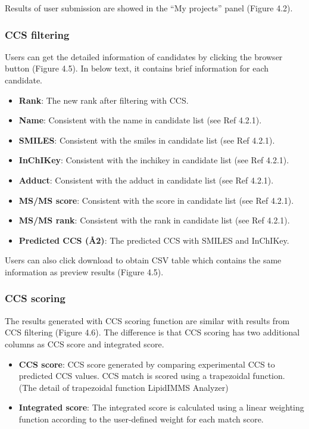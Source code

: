 \documentclass[12pt,]{book}
\providecommand{\tightlist}{%
  \setlength{\itemsep}{0pt}\setlength{\parskip}{0pt}}
\theoremstyle{definition}
\theoremstyle{definition}
\theoremstyle{definition}
\theoremstyle{remark}
\begin{document}
Results of user submission are showed in the ``My projects'' panel
(Figure 4.2).

\subsubsection{CCS filtering}\label{ccs-filtering}

Users can get the detailed information of candidates by clicking the
browser button (Figure 4.5). In below text, it contains brief
information for each candidate.

\begin{itemize}
\tightlist
\item
  \textbf{Rank}: The new rank after filtering with CCS.
\item
  \textbf{Name}: Consistent with the name in candidate list (see Ref
  4.2.1).
\item
  \textbf{SMILES}: Consistent with the smiles in candidate list (see Ref
  4.2.1).
\item
  \textbf{InChIKey}: Consistent with the inchikey in candidate list (see
  Ref 4.2.1).
\item
  \textbf{Adduct}: Consistent with the adduct in candidate list (see Ref
  4.2.1).
\item
  \textbf{MS/MS score}: Consistent with the score in candidate list (see
  Ref 4.2.1).
\item
  \textbf{MS/MS rank}: Consistent with the rank in candidate list (see
  Ref 4.2.1).
\item
  \textbf{Predicted CCS (Å2)}: The predicted CCS with SMILES and
  InChIKey.
\end{itemize}

Users can also click download to obtain CSV table which contains the
same information as preview results (Figure 4.5).

\subsubsection{CCS scoring}\label{ccs-scoring}

The results generated with CCS scoring function are similar with results
from CCS filtering (Figure 4.6). The difference is that CCS scoring has
two additional columns as CCS score and integrated score.

\begin{itemize}
\tightlist
\item
  \textbf{CCS score}: CCS score generated by comparing experimental CCS
  to predicted CCS values. CCS match is scored using a trapezoidal
  function. (The detail of trapezoidal function LipidIMMS Analyzer)
\item
  \textbf{Integrated score}: The integrated score is calculated using a
  linear weighting function according to the user-defined weight for
  each match score.
\end{itemize}


\end{document}
